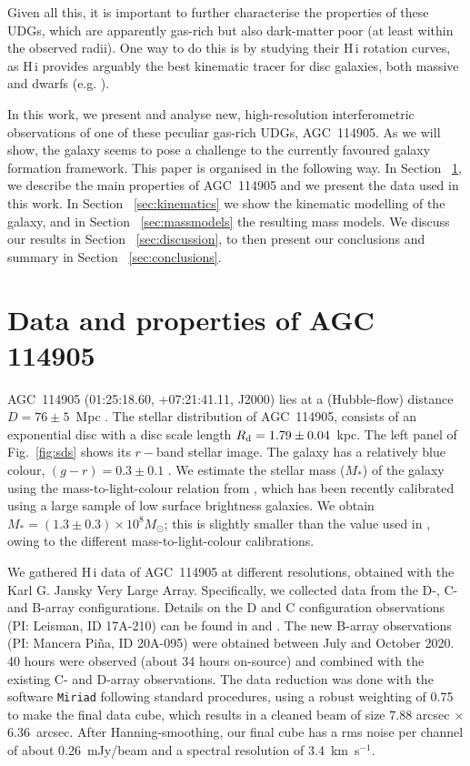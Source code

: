 \documentclass[fleqn,usenatbib]{mnras}
\begin{document}
Given all this, it is important to further characterise the properties of these UDGs, which are apparently gas-rich but also dark-matter poor (at least within the observed radii). One way to do this is by studying their H\,{\sc i} rotation curves, as H\,{\sc i} provides arguably the best kinematic tracer for disc galaxies, both massive and dwarfs (e.g. \citealt{begeman,deblok08,iorio}). 

In this work, we present and analyse new, high-resolution interferometric observations of one of these peculiar gas-rich UDGs, AGC~114905. As we will show, the galaxy seems to pose a challenge to the currently favoured galaxy formation framework. This paper is organised in the following way. In Section~ \ref{sec:data}, we describe the main properties of AGC~114905 and we present the data used in this work. In Section~ \ref{sec:kinematics} we show the kinematic modelling of the galaxy, and in Section~ \ref{sec:massmodels} the resulting mass models. We discuss our results in Section~ \ref{sec:discussion}, to then present our conclusions and summary in Section~ \ref{sec:conclusions}.

\section{Data and properties of AGC 114905}
\label{sec:data}
AGC~114905 (01:25:18.60, +07:21:41.11, J2000) lies at a (Hubble-flow) distance $D = 76 \pm 5$~Mpc \citep{leisman2017}. The stellar distribution of AGC~114905, consists of an exponential disc with a disc scale length $R_{\rm d} = 1.79 \pm 0.04$~kpc. The left panel of Fig.~\ref{fig:sds} shows its $r-$band stellar image. The galaxy has a relatively blue colour, $(g-r) = 0.3\pm 0.1$ \citep{huds2020,lexi}. We estimate the stellar mass ($M_\ast$) of the galaxy using the mass-to-light-colour relation from \citet{du2020}, which has been recently calibrated using a large sample of low surface brightness galaxies. We obtain $M_\ast = (1.3\pm 0.3)\times 10^8 M_\odot$; this is slightly smaller than the value used in \citet{huds2019,huds2020}, owing to the different mass-to-light-colour calibrations.

We gathered H\,{\sc i} data of AGC~114905 at different resolutions, obtained with the Karl G. Jansky Very Large Array. Specifically, we collected data from the D-, C- and B-array configurations. Details on the D and C configuration observations (PI: Leisman, ID 17A-210) can be found in \citet{leisman2017} and \citet{lexi}. The new B-array observations (PI: Mancera Pi\~na, ID 20A-095) were obtained between July and October 2020. 40 hours were observed (about 34 hours on-source) and combined with the existing C- and D-array observations. The data reduction was done with the software \texttt{Miriad} \citep{miriad} following standard procedures, using a robust weighting of 0.75 to make the final data cube, which results in a cleaned beam of size $7.88$ arcsec $\times$ 6.36~arcsec. After Hanning-smoothing, our final cube has a rms noise per channel of about 0.26~mJy/beam and a spectral resolution of 3.4~km~s$^{-1}$.
\end{document}
